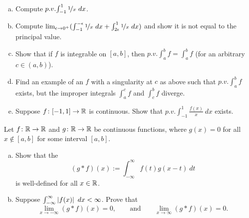 \begin{exercise}
{\ }
\begin{enumerate}[a)]
\item
Compute $p.v.\!\int_{-1}^1 \nicefrac{1}{x}~dx$.
\item
Compute
$\lim_{\epsilon\to 0^+}
( \int_{-1}^{-\epsilon} \nicefrac{1}{x}~dx + 
\int_{2\epsilon}^1 \nicefrac{1}{x}~dx )$ and show it is not equal
to the principal value.
\item
Show that if $f$ is integrable on $[a,b]$, then
$p.v.\!\int_a^b f = \int_a^b f$ (for an arbitrary $c \in (a,b)$).
\item
Find an example of an $f$ with a singularity at $c$ as above
such that 
$p.v.\!\int_a^b f$ exists, but the improper integrals
$\int_a^c f$ and $\int_c^b f$ diverge.
\item
Suppose 
$f \colon [-1,1] \to {\mathbb{R}}$ is continuous.  Show that
$p.v.\!\int_{-1}^1 \frac{f(x)}{x}~dx$ exists.
\end{enumerate}
\end{exercise}

\begin{samepage}
\begin{exercise}
Let $f \colon {\mathbb{R}} \to {\mathbb{R}}$ and 
$g \colon {\mathbb{R}} \to {\mathbb{R}}$ be continuous functions, where
$g(x) = 0$ for all $x \notin [a,b]$ for some interval $[a,b]$.
\begin{enumerate}[a)]
\item
Show that the
\emph{}
\begin{equation*}
(g * f)(x) := \int_{-\infty}^\infty f(t)g(x-t)~dt 
\end{equation*}
is well-defined for all $x \in {\mathbb{R}}$.
\item
Suppose $\int_{-\infty}^\infty \left\lvert {f(x)} \right\rvert~dx < \infty$.  Prove that
\begin{equation*}
\lim_{x \to -\infty} (g * f)(x) = 0, \qquad \text{and} \qquad
\lim_{x \to \infty} (g * f)(x) = 0 .
\end{equation*}
\end{enumerate}
\end{exercise}
\end{samepage}
